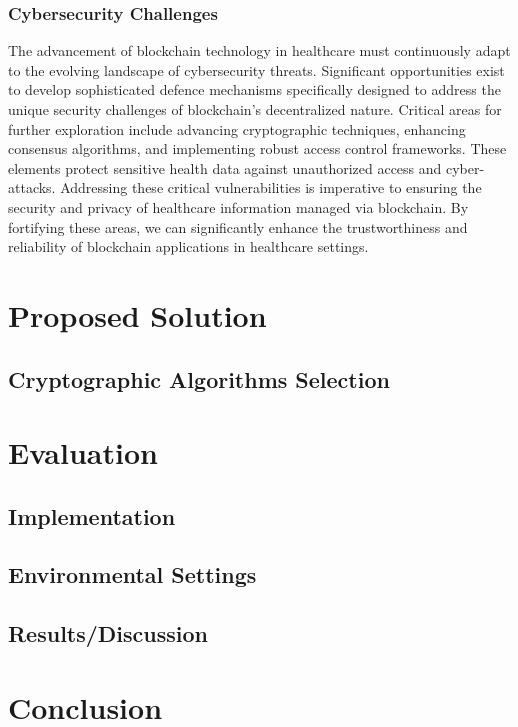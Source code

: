 \documentclass[cic,tc,english]{iiufrgs}
\begin{document}
        \subsection{Cybersecurity Challenges} 
            The advancement of blockchain technology in healthcare must continuously adapt to the evolving landscape of cybersecurity threats. Significant opportunities exist to develop sophisticated defence mechanisms specifically designed to address the unique security challenges of blockchain's decentralized nature. Critical areas for further exploration include advancing cryptographic techniques, enhancing consensus algorithms, and implementing robust access control frameworks. These elements protect sensitive health data against unauthorized access and cyber-attacks. Addressing these critical vulnerabilities is imperative to ensuring the security and privacy of healthcare information managed via blockchain. By fortifying these areas, we can significantly enhance the trustworthiness and reliability of blockchain applications in healthcare settings.

\chapter{Proposed Solution}

\section{Cryptographic Algorithms Selection}

\chapter{Evaluation}

\section{Implementation}

\section{Environmental Settings}

\section{Results/Discussion}

\chapter{Conclusion}
\end{document}
